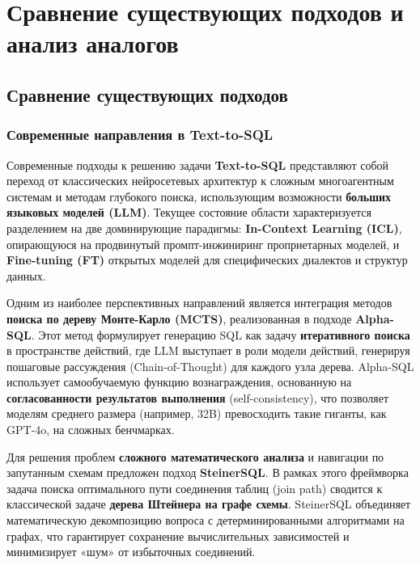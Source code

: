 \section{Сравнение существующих подходов и анализ аналогов}

\subsection{Сравнение существующих подходов}

\subsubsection{Современные направления в Text-to-SQL}

Современные подходы к решению задачи \textbf{Text-to-SQL} представляют собой переход от классических нейросетевых архитектур к сложным многоагентным системам и методам глубокого поиска, использующим возможности \textbf{больших языковых моделей (LLM)}.  \cite{hong2025survey} Текущее состояние области характеризуется разделением на две доминирующие парадигмы: \textbf{In-Context Learning (ICL)}, опирающуюся на продвинутый промпт-инжиниринг проприетарных моделей, и \textbf{Fine-tuning (FT)} открытых моделей для специфических диалектов и структур данных. \cite{li2024bird}

Одним из наиболее перспективных направлений является интеграция методов \textbf{поиска по дереву Монте-Карло (MCTS)}, реализованная в подходе \textbf{Alpha-SQL}. \cite{li2025alphasql} Этот метод формулирует генерацию SQL как задачу \textbf{итеративного поиска} в пространстве действий, где LLM выступает в роли модели действий, генерируя пошаговые рассуждения (Chain-of-Thought) для каждого узла дерева. Alpha-SQL использует самообучаемую функцию вознаграждения, основанную на \textbf{согласованности результатов выполнения} (self-consistency), что позволяет моделям среднего размера (например, 32B) превосходить такие гиганты, как GPT-4o, на сложных бенчмарках.

Для решения проблем \textbf{сложного математического анализа} и навигации по запутанным схемам предложен подход \textbf{SteinerSQL}. \cite{mao2025steinersql} В рамках этого фреймворка задача поиска оптимального пути соединения таблиц (join path) сводится к классической задаче \textbf{дерева Штейнера на графе схемы}. SteinerSQL объединяет математическую декомпозицию вопроса с детерминированными алгоритмами на графах, что гарантирует сохранение вычислительных зависимостей и минимизирует «шум» от избыточных соединений.

